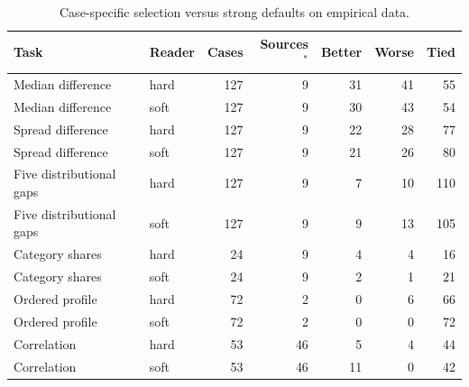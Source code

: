 \begin{longtable}{llrrrrr}
\caption{Case-specific selection versus strong defaults on empirical data.}\label{tab:policy-outcomes}\\
\toprule Task & Reader & Cases & Sources$^*$ & Better & Worse & Tied\\\midrule\endhead
Median difference & hard & 127 & 9 & 31 & 41 & 55\\
Median difference & soft & 127 & 9 & 30 & 43 & 54\\
Spread difference & hard & 127 & 9 & 22 & 28 & 77\\
Spread difference & soft & 127 & 9 & 21 & 26 & 80\\
Five distributional gaps & hard & 127 & 9 & 7 & 10 & 110\\
Five distributional gaps & soft & 127 & 9 & 9 & 13 & 105\\
Category shares & hard & 24 & 9 & 4 & 4 & 16\\
Category shares & soft & 24 & 9 & 2 & 1 & 21\\
Ordered profile & hard & 72 & 2 & 0 & 6 & 66\\
Ordered profile & soft & 72 & 2 & 0 & 0 & 72\\
Correlation & hard & 53 & 46 & 5 & 4 & 44\\
Correlation & soft & 53 & 46 & 11 & 0 & 42\\
\bottomrule\end{longtable}